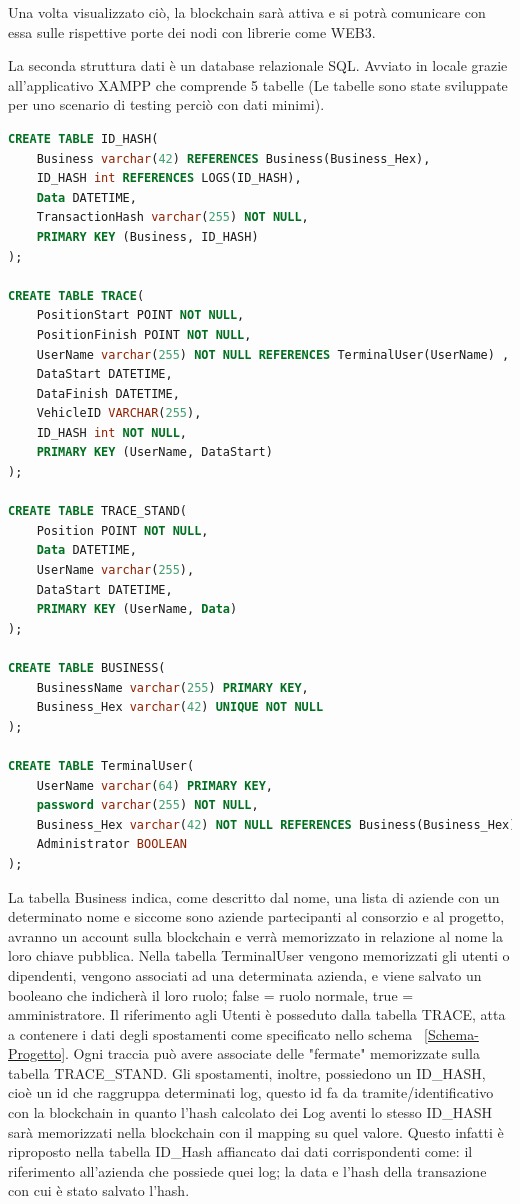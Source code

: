 \documentclass[11pt,a4paper,titlepage, twoside, openright]{report}
\begin{document}
Una volta visualizzato ciò, la blockchain sarà attiva e si potrà comunicare con essa sulle rispettive porte dei nodi con librerie come WEB3.

La seconda struttura dati è un database relazionale SQL. Avviato in locale grazie all'applicativo XAMPP che comprende 5 tabelle (Le tabelle sono state sviluppate per uno scenario di testing perciò con dati minimi).
\begin{lstlisting}[language=SQL]
CREATE TABLE ID_HASH(
	Business varchar(42) REFERENCES Business(Business_Hex),
	ID_HASH int REFERENCES LOGS(ID_HASH),
	Data DATETIME,
	TransactionHash varchar(255) NOT NULL,
	PRIMARY KEY (Business, ID_HASH)
);

CREATE TABLE TRACE(
	PositionStart POINT NOT NULL,
	PositionFinish POINT NOT NULL,
	UserName varchar(255) NOT NULL REFERENCES TerminalUser(UserName) ,
	DataStart DATETIME,
	DataFinish DATETIME,
	VehicleID VARCHAR(255),
	ID_HASH int NOT NULL,
	PRIMARY KEY (UserName, DataStart)
);

CREATE TABLE TRACE_STAND(
	Position POINT NOT NULL,
	Data DATETIME,
	UserName varchar(255),
	DataStart DATETIME,
	PRIMARY KEY (UserName, Data)
);

CREATE TABLE BUSINESS(
	BusinessName varchar(255) PRIMARY KEY,
	Business_Hex varchar(42) UNIQUE NOT NULL
);

CREATE TABLE TerminalUser(
	UserName varchar(64) PRIMARY KEY,
	password varchar(255) NOT NULL,
	Business_Hex varchar(42) NOT NULL REFERENCES Business(Business_Hex),
	Administrator BOOLEAN
);
\end{lstlisting}

La tabella Business indica, come descritto dal nome, una lista di aziende con un determinato nome e siccome sono aziende partecipanti al consorzio e al progetto, avranno un account sulla blockchain e verrà memorizzato in relazione al nome la loro chiave pubblica. Nella tabella TerminalUser vengono memorizzati gli utenti o dipendenti, vengono associati ad una determinata azienda, e viene salvato un booleano che indicherà il loro ruolo; false = ruolo normale, true = amministratore. Il riferimento agli Utenti è posseduto dalla tabella TRACE, atta a contenere i dati degli spostamenti come specificato nello schema ~\ref{Schema-Progetto}. Ogni traccia può avere associate delle "fermate" memorizzate sulla tabella TRACE\_STAND. Gli spostamenti, inoltre, possiedono un ID\_HASH, cioè un id che raggruppa determinati log, questo id fa da tramite/identificativo con la blockchain in quanto l'hash calcolato dei Log aventi lo stesso ID\_HASH sarà memorizzati nella blockchain con il mapping su quel valore. Questo infatti è riproposto nella tabella ID\_Hash affiancato dai dati corrispondenti come: il riferimento all'azienda che possiede quei log; la data e l'hash della transazione con cui è stato salvato l'hash.
\end{document}
